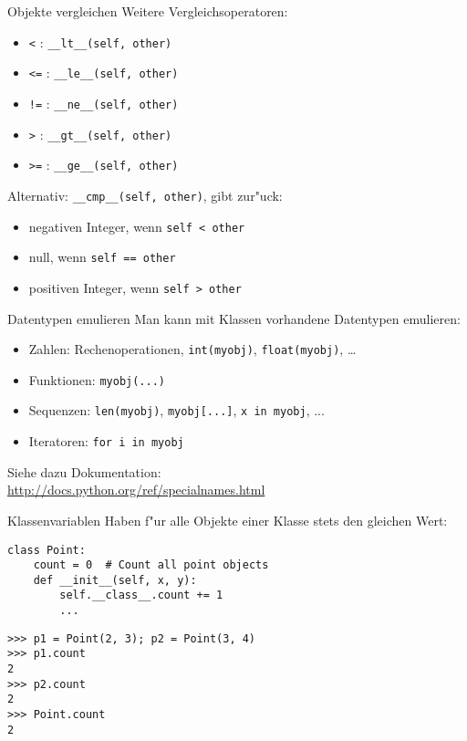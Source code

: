 \begin{frame}[fragile]{Objekte vergleichen}
Weitere Vergleichsoperatoren:
\begin{itemize}
\item \texttt{<} : \lstinline{__lt__(self, other)}
\item \texttt{<=} : \lstinline{__le__(self, other)}
\item \texttt{!=} : \lstinline{__ne__(self, other)}
\item \texttt{>} : \lstinline{__gt__(self, other)}
\item \texttt{>=} : \lstinline{__ge__(self, other)}
\end{itemize}
\vspace{2mm}
Alternativ: \lstinline{__cmp__(self, other)}, gibt zur"uck:
\begin{itemize}
\item negativen Integer, wenn \lstinline{self < other}
\item null, wenn \lstinline{self == other}
\item positiven Integer, wenn \lstinline{self > other}
\end{itemize}
\end{frame}

\begin{frame}{Datentypen emulieren}
Man kann mit Klassen vorhandene Datentypen emulieren:
\begin{itemize}
\item Zahlen: Rechenoperationen, \texttt{int(myobj)}, \texttt{float(myobj)}, \dots
\item Funktionen: \texttt{myobj(...)}
\item Sequenzen: \texttt{len(myobj)}, \texttt{myobj[...]}, \lstinline{x in myobj}, ...
\item Iteratoren: \lstinline{for i in myobj}
\end{itemize}
\vspace{2mm}
Siehe dazu Dokumentation:\\
\href{http://docs.python.org/ref/specialnames.html}{http://docs.python.org/ref/specialnames.html}
\end{frame}

\begin{frame}[fragile]{Klassenvariablen}
Haben f"ur alle Objekte einer Klasse stets den gleichen Wert:
\begin{lstlisting}[style=Python]
class Point:
    count = 0  # Count all point objects
    def __init__(self, x, y):
        self.__class__.count += 1
        ...
\end{lstlisting}
\begin{lstlisting}[style=Shell]
>>> p1 = Point(2, 3); p2 = Point(3, 4)
>>> p1.count
2
>>> p2.count
2
>>> Point.count
2
\end{lstlisting}
\end{frame}


